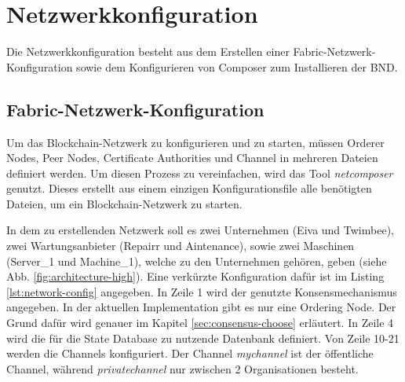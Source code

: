 
\section{Netzwerkkonfiguration}
\label{sec:network-config}
Die Netzwerkkonfiguration besteht aus dem Erstellen einer Fabric-Netzwerk-Konfiguration sowie dem Konfigurieren von Composer zum Installieren der \acs{BND}. 

\subsection{Fabric-Netzwerk-Konfiguration}
Um das Blockchain-Netzwerk zu konfigurieren und zu starten, müssen Orderer Nodes, Peer Nodes, Certificate Authorities und Channel in mehreren Dateien definiert werden. Um diesen Prozess zu vereinfachen, wird das Tool \textit{netcomposer}\cite{IBMSilvergateTeamnetcomposerGithubRepository2018} genutzt. Dieses erstellt aus einem einzigen Konfigurationsfile alle benötigten Dateien, um ein Blockchain-Netzwerk zu starten. 

In dem zu erstellenden Netzwerk soll es zwei Unternehmen (Eiva und Twimbee), zwei Wartungsanbieter (Repairr und Aintenance), sowie zwei Maschinen (Server\_1 und Machine\_1), welche zu den Unternehmen gehören, geben (siehe Abb. \ref{fig:architecture-high}). Eine verkürzte Konfiguration dafür ist im Listing \ref{lst:network-config} angegeben. In Zeile 1 wird der genutzte Konsensmechanismus angegeben. In der aktuellen Implementation gibt es nur eine Ordering Node. Der Grund dafür wird genauer im Kapitel \ref{sec:consensus-choose} erläutert. In Zeile 4 wird die für die State Database zu nutzende Datenbank definiert. Von Zeile 10-21 werden die Channels konfiguriert. Der Channel \textit{mychannel} ist der öffentliche Channel, während \textit{privatechannel} nur zwischen 2 Organisationen besteht. 

